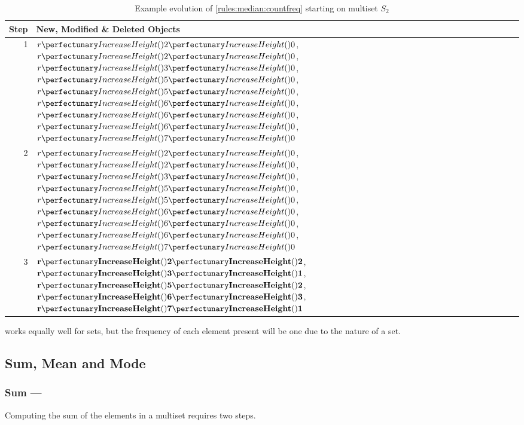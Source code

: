 \begin{table}[htbp]
\centering
   \begin{tabular}{|r|l|}
    \hline
    \textbf{Step} & \textbf{New, Modified \& Deleted Objects} \\ \hline
    1 & \(\cpfuncn{r}{2}{0}\), \(\cpfuncn{r}{2}{0}\), \(\cpfuncn{r}{3}{0}\), \(\cpfuncn{r}{5}{0}\), \(\cpfuncn{r}{5}{0}\), \(\cpfuncn{r}{6}{0}\), \(\cpfuncn{r}{6}{0}\), \(\cpfuncn{r}{6}{0}\), \(\cpfuncn{r}{7}{0}\)\\ \hline
    
    2 & \(\cpfuncn{r}{2}{0}\), \sout{\(\cpfuncn{r}{2}{0}\)}, \(\cpfuncn{r}{3}{0}\), \(\cpfuncn{r}{5}{0}\), \sout{\(\cpfuncn{r}{5}{0}\)}, \(\cpfuncn{r}{6}{0}\), \sout{\(\cpfuncn{r}{6}{0}\)}, \sout{\(\cpfuncn{r}{6}{0}\)}, \(\cpfuncn{r}{7}{0}\)\\ \hline
    
    3 & \(\mathbf{\cpfuncn{r}{2}{2}}\), \(\mathbf{\cpfuncn{r}{3}{1}}\), \(\mathbf{\cpfuncn{r}{5}{2}}\), \(\mathbf{\cpfuncn{r}{6}{3}}\), \(\mathbf{\cpfuncn{r}{7}{1}}\)\\ \hline
\end{tabular}
\caption[Example evolution of \cref{rules:median:countfreq} to count the frequency of elements in a multiset]{\label{tab:median:countfreq}Example evolution of \cref{rules:median:countfreq} starting on multiset \(S_2\)}
\end{table}

 works equally well for sets, but the frequency of each element present will be one due to the nature of a set.

\subsection{Sum, Mean and Mode}\label{sec:median:sumeanmode}

\subsubsection{Sum --- }\label{sec:median:sum}

\begin{proposition}\label{prop:median:sum}
Computing the sum of the elements in a multiset requires two steps.
\end{proposition}

